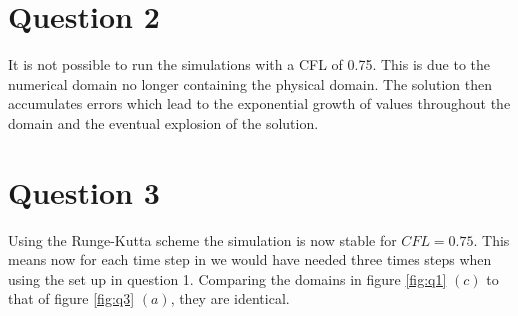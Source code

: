 \documentclass[10pt, a4paper]{article}
\begin{document}
\section*{Question 2}

\noindent
\newline
It is not possible to run the simulations with a CFL of 0.75. This is due to the numerical domain no longer containing the physical domain. The solution then accumulates errors which lead to the exponential growth of values throughout the domain and the eventual explosion of the solution.
\newpage
\section*{Question 3}

\noindent
\newline
Using the Runge-Kutta scheme the simulation is now stable for $CFL=0.75$. This means now for each time step in we would have needed three times steps when using the set up in question 1. Comparing the domains in figure \ref{fig:q1} $(c)$ to that of figure \ref{fig:q3} $(a)$, they are identical.
\end{document}
